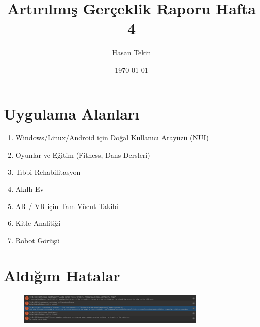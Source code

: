 \documentclass[12pt, a4paper]{article}
\begin{document}
	
	
	
	\section{Uygulama Alanları}
	\begin{enumerate}
		\item Windows/Linux/Android için Doğal Kullanıcı Arayüzü (NUI)
		\item Oyunlar ve Eğitim (Fitness, Dans Dersleri)
		\item Tıbbi Rehabilitasyon
		\item Akıllı Ev
		\item AR / VR için Tam Vücut Takibi
		\item Kitle Analitiği
		\item Robot Görüşü
		
		\cite{3DiViBasic}
		
	\end{enumerate}
	
	\section{Aldığım Hatalar}
	\begin{figure}[!ht]
		\caption{}
		\centering
		\includegraphics[width=0.8\textwidth]{unityHataPNG.PNG}
		
		\label{Hata}
		
	\end{figure}
	
	\newpage
	
	\title{Artırılmış Gerçeklik Raporu Hafta 4}
	\author{Hasan Tekin}
	\date{\today}
	\maketitle
	\setcounter{section}{0}
	
	
\end{document}
